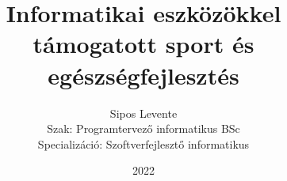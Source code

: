 \documentclass[tocnopagenum]{thesis-ekf}
\theoremstyle{definition}
\theoremstyle{remark}
\begin{document}
	\title{Informatikai eszközökkel támogatott sport és egészségfejlesztés}
	\author{Sipos Levente\\Szak: Programtervező informatikus BSc\\Specializáció: Szoftverfejlesztő informatikus}
	\date{2022}
	\begin{titlepage}
		\maketitle
	\end{titlepage}
	
	\tableofcontents

\end{document}
